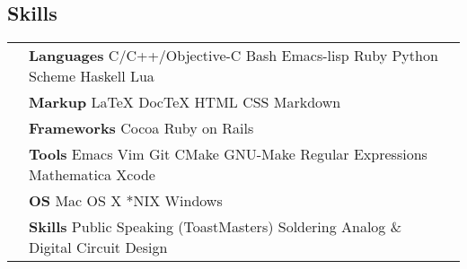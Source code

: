 \documentclass[margin,line,12pt]{res}
\begin{document}
{\begin{resume}
{  \section{\sc Skills}}
\hspace{-.35in}
{\renewcommand{\arraystretch}{1.25}
  \renewcommand{\tabcolsep}{0.175cm}
  \begin{tabular}{l l l}
    & {\bf Languages} C/C++/Objective-C Bash Emacs-lisp Ruby Python Scheme Haskell Lua \\
    & {\bf Markup} \LaTeX{} Doc\TeX{} HTML CSS Markdown \\
    & {\bf Frameworks} Cocoa  Ruby on Rails \\
    & {\bf Tools} Emacs Vim Git CMake GNU-Make Regular Expressions Mathematica Xcode \\
    & {\bf OS} Mac OS X *NIX Windows \\
    & {\bf Skills} Public Speaking (ToastMasters) Soldering  Analog \& Digital Circuit Design \\
  \end{tabular}}






\end{resume}}
\end{document}
